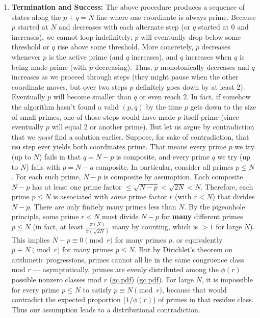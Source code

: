 \documentclass[12pt]{article}
\begin{document}
\begin{enumerate}[leftmargin=*, label=\arabic*.]
  \item \textbf{Termination and Success:} The above procedure produces a sequence of states along the $p+q=N$ line where one coordinate is always prime. Because $p$ started at $N$ and decreases with each alternate step (or $q$ started at 0 and increases), we cannot loop indefinitely; $p$ will eventually drop below some threshold or $q$ rise above some threshold. More concretely, $p$ decreases whenever $p$ is the active prime (and $q$ increases), and $q$ increases when $q$ is being made prime (with $p$ decreasing). Thus, $p$ monotonically decreases and $q$ increases as we proceed through steps (they might pause when the other coordinate moves, but over two steps $p$ definitely goes down by at least 2). Eventually $p$ will become smaller than $q$ or even reach 2. In fact, if somehow the algorithm hasn’t found a valid $(p,q)$ by the time $p$ gets down to the size of small primes, one of those steps would have made $p$ itself prime (since eventually $p$ will equal 2 or another prime). But let us argue by contradiction that we \emph{must} find a solution earlier. Suppose, for sake of contradiction, that \textbf{no} step ever yields both coordinates prime. That means every prime $p$ we try (up to $N$) fails in that $q= N-p$ is composite, and every prime $q$ we try (up to $N$) fails with $p=N-q$ composite. In particular, consider all primes $p \le N$. For each such prime, $N-p$ is composite by assumption. Each composite $N-p$ has at least one prime factor $\le \sqrt{N-p} < \sqrt{2N} < N$. Therefore, each prime $p\le N$ is associated with \emph{some} prime factor $r$ (with $r<N$) that divides $N-p$. There are only finitely many primes less than $N$. By the pigeonhole principle, some prime $r < N$ must divide $N-p$ for \textbf{many} different primes $p\le N$ (in fact, at least $\frac{\pi(N)}{\pi(\sqrt{2N})}$ many by counting, which is $>1$ for large $N$). This implies $N-p \equiv 0 \pmod{r}$ for many primes $p$, or equivalently $p \equiv N \pmod{r}$ for many primes $p \le N$. But by Dirichlet’s theorem on arithmetic progressions, primes cannot all lie in the same congruence class mod $r$ --- asymptotically, primes are evenly distributed among the $\phi(r)$ possible nonzero classes mod $r$ (\href{file://file-7ZYYwSHWVa83XEVTrEhg5z#:~:text=That%20implies%20a%20congruence%20%242N,the%20single%20congruence%20class%20%242N}{gc.pdf}) (\href{file://file-7ZYYwSHWVa83XEVTrEhg5z#:~:text=not%20all%20concentrated%20in%20one,In%20short%2C%20assuming%20no%20Goldbach}{gc.pdf}). For large $N$, it is impossible for every prime $p\le N$ to satisfy $p\equiv N \pmod{r}$, because that would contradict the expected proportion ($1/\phi(r)$) of primes in that residue class. Thus our assumption leads to a distributional contradiction.


\end{enumerate}
\end{document}
